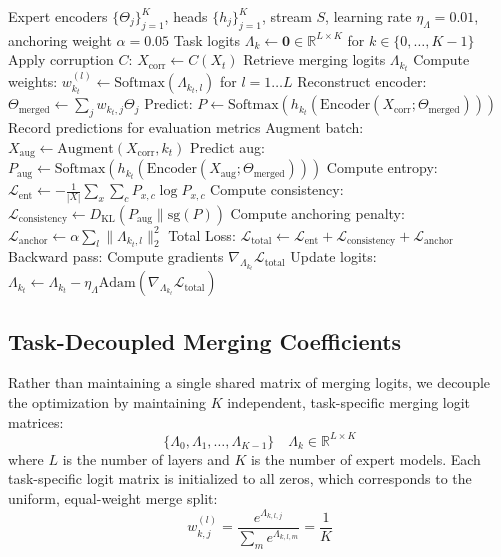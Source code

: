 \documentclass{article}
\theoremstyle{plain}
\theoremstyle{definition}
\theoremstyle{remark}
\begin{document}
\begin{algorithm}[tb]
\caption{Task-Decoupled Anchored Test-Time Model Merging (TD-ATMM)}
\label{alg:td_atmm}
\begin{algorithmic}[1]
    Expert encoders $\{\Theta_j\}_{j=1}^K$, heads $\{h_j\}_{j=1}^K$, stream $S$, learning rate $\eta_{\Lambda} = 0.01$, anchoring weight $\alpha = 0.05$
    Task logits $\Lambda_k \leftarrow \mathbf{0} \in \mathbb{R}^{L \times K}$ for $k \in \{0, \dots, K-1\}$
     \STATE Apply corruption $C$: $X_{\text{corr}} \leftarrow C(X_t)$
     \STATE Retrieve merging logits $\Lambda_{k_t}$
     \STATE Compute weights: $w_{k_t}^{(l)} \leftarrow \text{Softmax}(\Lambda_{k_t, l})$ for $l=1\dots L$
     \STATE Reconstruct encoder: $\Theta_{\text{merged}} \leftarrow \sum_j w_{k_t, j} \Theta_j$
     \STATE Predict: $P \leftarrow \text{Softmax}(h_{k_t}(\text{Encoder}(X_{\text{corr}}; \Theta_{\text{merged}})))$
     \STATE Record predictions for evaluation metrics
     \STATE Augment batch: $X_{\text{aug}} \leftarrow \text{Augment}(X_{\text{corr}}, k_t)$
     \STATE Predict aug: $P_{\text{aug}} \leftarrow \text{Softmax}(h_{k_t}(\text{Encoder}(X_{\text{aug}}; \Theta_{\text{merged}})))$
     \STATE Compute entropy: $\mathcal{L}_{\text{ent}} \leftarrow -\frac{1}{|X|} \sum_x \sum_c P_{x, c} \log P_{x, c}$
     \STATE Compute consistency: $\mathcal{L}_{\text{consistency}} \leftarrow D_{\text{KL}}(P_{\text{aug}} \parallel \text{sg}(P))$
     \STATE Compute anchoring penalty: $\mathcal{L}_{\text{anchor}} \leftarrow \alpha \sum_l \|\Lambda_{k_t, l}\|_2^2$
     \STATE Total Loss: $\mathcal{L}_{\text{total}} \leftarrow \mathcal{L}_{\text{ent}} + \mathcal{L}_{\text{consistency}} + \mathcal{L}_{\text{anchor}}$
     \STATE Backward pass: Compute gradients $\nabla_{\Lambda_{k_t}} \mathcal{L}_{\text{total}}$
     \STATE Update logits: $\Lambda_{k_t} \leftarrow \Lambda_{k_t} - \eta_{\Lambda} \text{Adam}(\nabla_{\Lambda_{k_t}} \mathcal{L}_{\text{total}})$
   \ENDFOR
\end{algorithmic}
\end{algorithm}

\subsection{Task-Decoupled Merging Coefficients}
Rather than maintaining a single shared matrix of merging logits, we decouple the optimization by maintaining $K$ independent, task-specific merging logit matrices:
\begin{equation}
\{\Lambda_0, \Lambda_1, \dots, \Lambda_{K-1}\} \quad \Lambda_k \in \mathbb{R}^{L \times K}
\end{equation}
where $L$ is the number of layers and $K$ is the number of expert models. Each task-specific logit matrix is initialized to all zeros, which corresponds to the uniform, equal-weight merge split:
\begin{equation}
w_{k, j}^{(l)} = \frac{e^{\Lambda_{k, l, j}}}{\sum_{m} e^{\Lambda_{k, l, m}}} = \frac{1}{K}
\end{equation}
\end{document}
